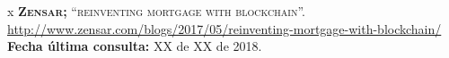 \begin{thebibliography} {x}
	 \textsc{\textbf{Zensar; }} \textsc{“reinventing mortgage with blockchain”.}
	\url{http://www.zensar.com/blogs/2017/05/reinventing-mortgage-with-blockchain/}
	\newline \textbf{Fecha última consulta:} XX de XX de 2018.
						
						
																				
		 										
	\endgroup
\end{thebibliography}